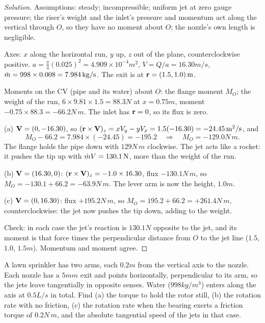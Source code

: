 \begin{proof}[Solution]
Assumptions: steady; incompressible; uniform jet at zero gauge pressure; the riser's weight and the inlet's pressure and momentum act along the vertical through $O$, so they have no moment about $O$; the nozzle's own length is negligible.

Axes: $x$ along the horizontal run, $y$ up, $z$ out of the plane, counterclockwise positive. $a = \tfrac{\pi}{4}(0.025)^2 = 4.909\times10^{-4}\unit{m^2}$, $V = Q/a = 16.30\unit{m/s}$, $\dot m = 998\times0.008 = 7.984\,\mathrm{kg/s}$. The exit is at $\mathbf{r} = (1.5, 1.0)\,\mathrm{m}$.

Moments on the CV (pipe and its water) about $O$: the flange moment $M_O$; the weight of the run, $6\times9.81\times1.5 = 88.3\unit{N}$ at $x = 0.75\unit{m}$, moment $-0.75\times88.3 = -66.2\unit{N\,m}$. The inlet has $\mathbf{r} = 0$, so its flux is zero.

(a) $\mathbf{V} = (0, -16.30)$, so $(\mathbf{r}\times\mathbf{V})_z = xV_y - yV_x = 1.5(-16.30) = -24.45\,\mathrm{m^2/s}$, and
\[
M_O - 66.2 = 7.984\times(-24.45) = -195.2\quad\Rightarrow\quad M_O = -129.0\unit{N\,m}.
\]
The flange holds the pipe down with $129\unit{N\,m}$ clockwise. The jet acts like a rocket: it pushes the tip up with $\dot m V = 130.1\,\mathrm{N}$, more than the weight of the run.

(b) $\mathbf{V} = (16.30, 0)$: $(\mathbf{r}\times\mathbf{V})_z = -1.0\times16.30$, flux $-130.1\unit{N\,m}$, so $M_O = -130.1 + 66.2 = -63.9\unit{N\,m}$. The lever arm is now the height, $1.0\unit{m}$.

(c) $\mathbf{V} = (0, 16.30)$: flux $+195.2\unit{N\,m}$, so $M_O = 195.2 + 66.2 = +261.4\unit{N\,m}$, counterclockwise: the jet now pushes the tip down, adding to the weight.

Check: in each case the jet's reaction is $130.1\unit{N}$ opposite to the jet, and its moment is that force times the perpendicular distance from $O$ to the jet line ($1.5$, $1.0$, $1.5\unit{m}$). Momentum and moment agree.
\end{proof}

\begin{example}
A lawn sprinkler has two arms, each $0.2\unit{m}$ from the vertical axis to the nozzle. Each nozzle has a $5\unit{mm}$ exit and points horizontally, perpendicular to its arm, so the jets leave tangentially in opposite senses. Water ($998\unit{kg/m^3}$) enters along the axis at $0.5\unit{L/s}$ in total. Find (a) the torque to hold the rotor still, (b) the rotation rate with no friction, (c) the rotation rate when the bearing exerts a friction torque of $0.2\unit{N\,m}$, and the absolute tangential speed of the jets in that case.
\end{example}


